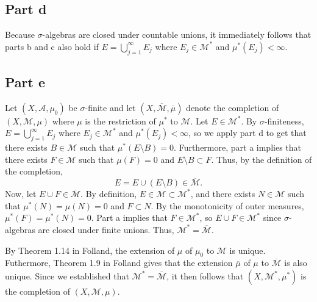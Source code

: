 \documentclass{article}
\begin{document}
\subsection{Part d}
Because $\sigma$-algebras are closed under countable unions, it immediately follows that parts b and c also hold if $E=\bigcup_{j=1}^\infty E_j$ where $E_j\in\mathcal M^*$ and $\mu^*(E_j)<\infty$.

\subsection{Part e}
Let $(X,\mathcal A,\mu_0)$ be $\sigma$-finite and let $(X,\overline{\mathcal M},\overline{\mu})$ denote the completion of $(X,\mathcal M,\mu)$ where $\mu$ is the restriction of $\mu^*$ to $\mathcal M$. Let $E\in\mathcal M^*$. By $\sigma$-finiteness, $E=\bigcup_{j=1}^\infty E_j$ where $E_j\in\mathcal M^*$ and $\mu^*(E_j)<\infty$, so we apply part d to get that there exists $B\in\mathcal M$ such that $\mu^*(E\setminus B)=0$. Furthermore, part a implies that there exists $F\in\mathcal M$ such that $\mu(F)=0$ and $E\setminus B\subset F$. Thus, by the definition of the completion,
\[
E=E\cup(E\setminus B)\in\overline{\mathcal M}.
\]
Now, let $E\cup F\in\overline{\mathcal M}$.  By definition, $E\in\mathcal M\subset \mathcal M^*$, and there exists $N\in\mathcal M$ such that $\mu^*(N)=\mu(N)=0$ and $F\subset N$. By the monotonicity of outer measures, $\mu^*(F)=\mu^*(N)=0$. Part a implies that $F\in\mathcal M^*$, so $E\cup F\in\mathcal M^*$ since $\sigma$-algebras are closed under finite unions. Thus, $\mathcal M^*=\overline{\mathcal M}$.

By Theorem 1.14 in Folland, the extension of $\mu$ of $\mu_0$ to $\mathcal M$ is unique. Futhermore, Theorem 1.9 in Folland gives that the extension $\overline{\mu}$ of $\mu$ to $\overline{\mathcal M}$ is also unique. Since we established that $\mathcal M^*=\overline{\mathcal M}$, it then follows that $(X,\mathcal M^*,\mu^*)$ is the completion of $(X,\mathcal M,\mu)$.
\end{document}
